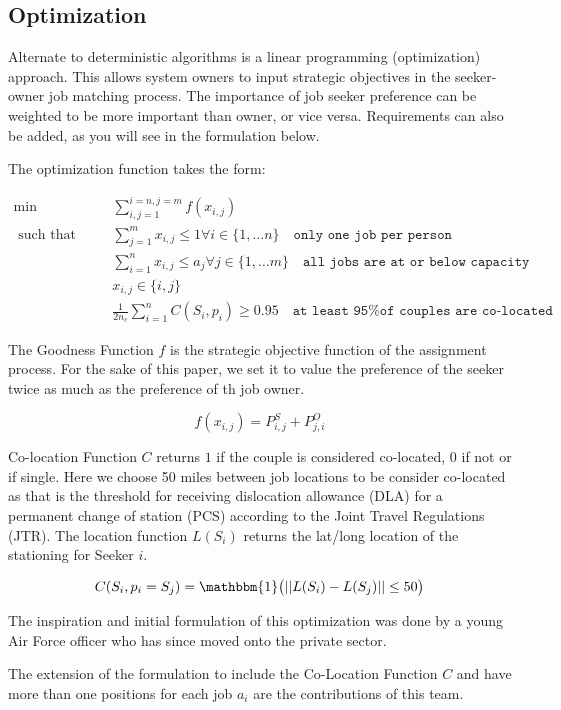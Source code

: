 \subsection{Optimization}

Alternate to deterministic algorithms is a linear programming (optimization) approach. This allows system owners to input strategic objectives in the seeker-owner job matching process. The importance of job seeker preference can be weighted to be more important than owner, or vice versa. Requirements can also be added, as you will see in the formulation below.

The optimization function takes the form:

\begin{align}
\min \qquad & \sum_{i,j = 1}^{i=n, j=m}f(x_{i,j}) \\
\text{ such that } \qquad & \sum_{j=1}^m x_{i,j} \leq 1  \forall i \in \{1, \dots n\} \quad \texttt{only one job per person} \\
& \sum_{i=1}^n x_{i,j} \leq a_j  \forall j \in \{1, \dots m\} \quad \texttt{all jobs are at or below capacity} \\
& x_{i,j} \in \{i,j\} \\
& \frac{1}{2n_c} \sum_{i=1}^n C(S_i, p_i) \geq 0.95 \quad \texttt{at least 95\% of couples are co-located}
\end{align}

The Goodness Function $f$ is the strategic objective function of the assignment process. For the sake of this paper, we set it to value the preference of the seeker twice as much as the preference of th job owner.

\[f(x_{i,j}) = P^S_{i,j} + P^O_{j,i}\]

Co-location Function $C$ returns $1$ if the couple is considered co-located, 0 if not or if single. Here we choose 50 miles between job locations to be consider co-located as that is the threshold for receiving dislocation allowance (DLA) for a permanent change of station (PCS) according to the Joint Travel Regulations (JTR). The location function $L(S_i)$ returns the lat/long location of the stationing for Seeker $i$. 

\[C(S_i, p_i = S_j) = \mathbbm{1}\big( || L(S_i) - L(S_j) || \leq 50 \big)\]


The inspiration and initial formulation of this optimization was done by a young Air Force officer who has since moved onto the private sector. 

The extension of the formulation to include the Co-Location Function $C$ and have more than one positions for each job $a_i$ are the contributions of this team. 